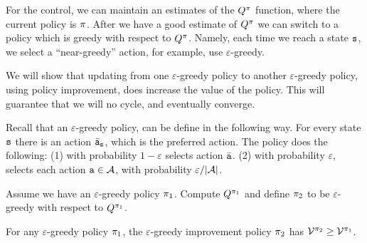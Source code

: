 For the control, we can maintain an estimates of the $Q^\pi$
function, where the current policy is $\pi$. After we have a
good estimate of $Q^\pi$ we can switch to a policy which is
greedy with respect to $Q^\pi$. Namely, each time we reach a
state ${\tt s}$, we select a ``near-greedy'' action, for example, use
$\varepsilon$-greedy.

We will show that updating from one $\varepsilon$-greedy policy to
another $\varepsilon$-greedy policy, using policy improvement, does
increase the value of the policy. This will guarantee that we will
no cycle, and eventually converge.

Recall that an $\varepsilon$-greedy policy, can be define in the
following way. For every state ${\tt s}$ there is an action
$\bar{{\tt a}}_{\tt s}$, which is the preferred action. The policy
does the following: (1) with probability $1-\varepsilon$ selects
action $\bar{{\tt a}}$. (2) with probability $\varepsilon$, selects
each action ${\tt a} \in \mathcal{A}$, with probability
$\varepsilon/|\mathcal{A}|$.

Assume we have an $\varepsilon$-greedy policy $\pi_1$. Compute
$Q^{\pi_1}$ and define $\pi_2$ to be $\varepsilon$-greedy
with respect to $Q^{\pi_1}$.

\begin{theorem}
For any $\varepsilon$-greedy policy $\pi_1$, the
$\varepsilon$-greedy improvement policy $\pi_2$ has
$\mathcal{V}^{\pi_2}\geq \mathcal{V}^{\pi_1}$.
\end{theorem}

